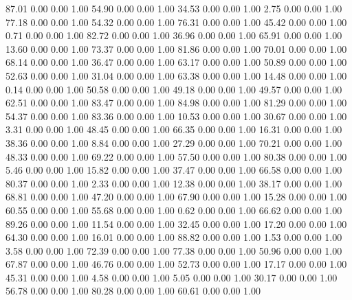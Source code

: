    87.01   0.00   0.00   1.00
   54.90   0.00   0.00   1.00
   34.53   0.00   0.00   1.00
    2.75   0.00   0.00   1.00
   77.18   0.00   0.00   1.00
   54.32   0.00   0.00   1.00
   76.31   0.00   0.00   1.00
   45.42   0.00   0.00   1.00
    0.71   0.00   0.00   1.00
   82.72   0.00   0.00   1.00
   36.96   0.00   0.00   1.00
   65.91   0.00   0.00   1.00
   13.60   0.00   0.00   1.00
   73.37   0.00   0.00   1.00
   81.86   0.00   0.00   1.00
   70.01   0.00   0.00   1.00
   68.14   0.00   0.00   1.00
   36.47   0.00   0.00   1.00
   63.17   0.00   0.00   1.00
   50.89   0.00   0.00   1.00
   52.63   0.00   0.00   1.00
   31.04   0.00   0.00   1.00
   63.38   0.00   0.00   1.00
   14.48   0.00   0.00   1.00
    0.14   0.00   0.00   1.00
   50.58   0.00   0.00   1.00
   49.18   0.00   0.00   1.00
   49.57   0.00   0.00   1.00
   62.51   0.00   0.00   1.00
   83.47   0.00   0.00   1.00
   84.98   0.00   0.00   1.00
   81.29   0.00   0.00   1.00
   54.37   0.00   0.00   1.00
   83.36   0.00   0.00   1.00
   10.53   0.00   0.00   1.00
   30.67   0.00   0.00   1.00
    3.31   0.00   0.00   1.00
   48.45   0.00   0.00   1.00
   66.35   0.00   0.00   1.00
   16.31   0.00   0.00   1.00
   38.36   0.00   0.00   1.00
    8.84   0.00   0.00   1.00
   27.29   0.00   0.00   1.00
   70.21   0.00   0.00   1.00
   48.33   0.00   0.00   1.00
   69.22   0.00   0.00   1.00
   57.50   0.00   0.00   1.00
   80.38   0.00   0.00   1.00
    5.46   0.00   0.00   1.00
   15.82   0.00   0.00   1.00
   37.47   0.00   0.00   1.00
   66.58   0.00   0.00   1.00
   80.37   0.00   0.00   1.00
    2.33   0.00   0.00   1.00
   12.38   0.00   0.00   1.00
   38.17   0.00   0.00   1.00
   68.81   0.00   0.00   1.00
   47.20   0.00   0.00   1.00
   67.90   0.00   0.00   1.00
   15.28   0.00   0.00   1.00
   60.55   0.00   0.00   1.00
   55.68   0.00   0.00   1.00
    0.62   0.00   0.00   1.00
   66.62   0.00   0.00   1.00
   89.26   0.00   0.00   1.00
   11.54   0.00   0.00   1.00
   32.45   0.00   0.00   1.00
   17.20   0.00   0.00   1.00
   64.30   0.00   0.00   1.00
   16.01   0.00   0.00   1.00
   88.82   0.00   0.00   1.00
    1.53   0.00   0.00   1.00
    3.58   0.00   0.00   1.00
   72.39   0.00   0.00   1.00
   77.38   0.00   0.00   1.00
   50.96   0.00   0.00   1.00
   67.87   0.00   0.00   1.00
   46.76   0.00   0.00   1.00
   52.73   0.00   0.00   1.00
   17.17   0.00   0.00   1.00
   45.31   0.00   0.00   1.00
    4.58   0.00   0.00   1.00
    5.05   0.00   0.00   1.00
   30.17   0.00   0.00   1.00
   56.78   0.00   0.00   1.00
   80.28   0.00   0.00   1.00
   60.61   0.00   0.00   1.00
